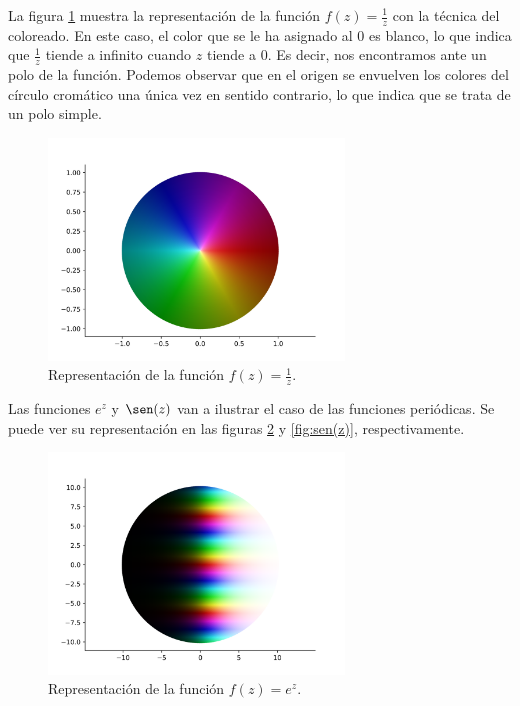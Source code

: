 La figura \ref{fig:1/z} muestra la representación de la función $f(z) = \frac{1}{z}$ con la técnica del coloreado. En este caso, el color que se le ha asignado al $0$ es blanco, lo que indica que $\frac{1}{z}$ tiende a infinito cuando $z$ tiende a $0$. Es decir, nos encontramos ante un polo de la función. Podemos observar que en el origen se envuelven los colores del círculo cromático una única vez en sentido contrario, lo que indica que se trata de un polo simple. \\

\begin{figure}[!htbp]
    \centering
    \includegraphics[width=0.7\textwidth]{../Aplicacion/1:z.png}
    \caption{Representación de la función $f(z) = \frac{1}{z}$.}
    \label{fig:1/z}
\end{figure}

Las funciones $e^z$ y $\sen(z)$ van a ilustrar el caso de las funciones periódicas. Se puede ver su representación en las figuras \ref{fig:e^z} y \ref{fig:sen(z)}, respectivamente. \\

\begin{figure}[!htbp]
    \centering
    \includegraphics[width=0.7\textwidth]{../Aplicacion/e^z.png}
    \caption{Representación de la función $f(z) = e^z$.}
    \label{fig:e^z}
\end{figure}

